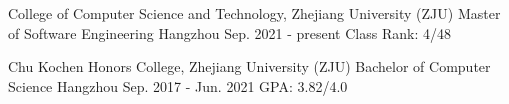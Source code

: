 \begin{cventries}

	\cventry
	{College of Computer Science and Technology, Zhejiang University (ZJU)} %
	{Master of Software Engineering} %
	{Hangzhou} %
	{Sep. 2021 - present} %
	{
		Class Rank: 4/48
	}%
	\vspace{1mm}

	\cventry
	{Chu Kochen Honors College, Zhejiang University (ZJU)} %
	{Bachelor of Computer Science} %
	{Hangzhou} %
	{Sep. 2017 - Jun. 2021} %
	{
		GPA: 3.82/4.0
	}%
	\vspace{1mm}
\end{cventries}
